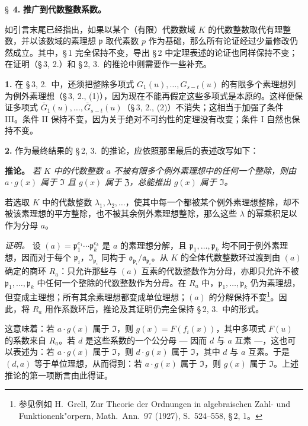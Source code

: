 \newpage
\S~\textbf{4.}
\textbf{推广到代数整数系数。}

\smallskip

\noindent
如引言末尾已经指出，如果以某个（有限）代数数域 $K$ 的代数整数取代有理整数，并以该数域的素理想 $\mathfrak{p}$ 取代素数 $p$ 作为基础，那么所有论证经过少量修改仍然成立。其中，\S\,1 完全保持不变，导出 \S\,2 中定理表述的论证也同样保持不变；在证明（\S\,3, 2.）和 \S\,2, 3.\ 的推论中则需要作一些补充。

\medskip\noindent\textbf{1.}
在 \S\,3, 2.\ 中，还须把整除多项式 $G_1(u),\ldots,G_{s-t}(u)$ 的有限多个素理想列为例外素理想（\S\,3, 2., (1)），因为现在不能再假定这些多项式是本原的。这样便保证多项式 $\bar{G}_1(u),\ldots,\bar{G}_{s-t}(u)$（\S\,3, 2., (2)）不消失；这相当于加强了条件 III。条件 II 保持不变，因为关于绝对不可约性的定理没有改变；条件 I 自然也保持不变。

\medskip\noindent\textbf{2.}
作为最终结果的 \S\,2, 3.\ 的推论，应依照那里最后的表述改写如下：

\noindent\textbf{推论。}
\textit{若 $K$ 中的代数整数 $a$ 不被有限多个例外素理想中的任何一个整除，则由 $a \cdot g(x)$ 属于 $\mathfrak{I}$ 且 $g(x)$ 属于 $\mathfrak{Z}$，总能推出 $g(x)$ 属于 $\mathfrak{I}$。}

若选取 $K$ 中的代数整数 $\lambda_1,\lambda_2,\ldots$，使其中每一个都被某个例外素理想整除，却不被该素理想的平方整除，也不被其余例外素理想整除，那么这些 $\lambda$ 的幂乘积足以作为分母 $a$。

\noindent\textit{证明。}
设 $(a) = \mathfrak{p}_1^{e_1} \cdots \mathfrak{p}_k^{e_k}$ 是 $a$ 的素理想分解，且 $\mathfrak{p}_1,\ldots,\mathfrak{p}_k$ 均不同于例外素理想，因而对于每个 $\mathfrak{p}_i$，$\mathfrak{I}_{\mathfrak{p}_i}$ 同构于 $\mathfrak{o}_{\mathfrak{p}_i}/\mathfrak{a}_{\mathfrak{p}_i}$。从 $K$ 的全体代数整数环过渡到由 $(a)$ 确定的商环 $R_a$：只允许那些与 $(a)$ 互素的代数整数作为分母，亦即只允许不被 $\mathfrak{p}_1,\ldots,\mathfrak{p}_k$ 中任何一个整除的代数整数作为分母。在 $R_a$ 中，$\mathfrak{p}_1,\ldots,\mathfrak{p}_k$ 仍为素理想，但变成主理想；所有其余素理想都变成单位理想；$(a)$ 的分解保持不变\footnote{参见例如 H.\ Grell, Zur Theorie der Ordnungen in algebraischen Zahl- und Funktionenk"orpern, Math.\ Ann.\ 97 (1927), S.\ 524--558, \S\,2, 1。}。因此，将 $R_a$ 用作系数环后，推论及其证明仍完全保持 \S\,2, 3.\ 中的形式。

这意味着：若 $a \cdot g(x)$ 属于 $\mathfrak{I}$，则 $g(x) = F(f_i(x))$，其中多项式 $F(u)$ 的系数来自 $R_a$。若 $d$ 是这些系数的一个公分母 --- 因而 $d$ 与 $a$ 互素 ---，这也可以表述为：若 $a \cdot g(x)$ 属于 $\mathfrak{I}$，则 $d \cdot g(x)$ 属于 $\mathfrak{I}$，其中 $d$ 与 $a$ 互素。于是 $(d, a)$ 等于单位理想，从而得到：若 $a \cdot g(x)$ 属于 $\mathfrak{I}$，则 $g(x)$ 属于 $\mathfrak{I}$。上述推论的第一项断言由此得证。

